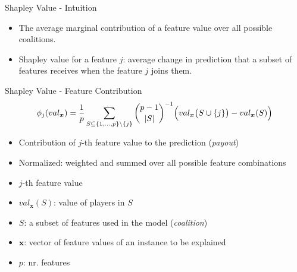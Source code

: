 \begin{frame}{Shapley Value - Intuition}
	\begin{itemize}
		\item The average marginal contribution of a feature value over all possible coalitions.
		\item Shapley value for a feature $j$: average change in prediction that a subset of features receives when the feature $j$ joins them.
	\end{itemize}
\end{frame}
\begin{frame}{Shapley Value - Feature Contribution}
\begin{equation}
	\phi_j(val_{\bm{x}})=\frac{1}{p}\sum_{S\subseteq\{1,\ldots,p\} \backslash \{j\}}\binom{p-1}{|S|}^{-1}\Bigl(val_{\bm{x}}\bigl(S\cup\{j\}\bigr)-val_{\bm{x}}(S)\Bigr)
\end{equation}
\begin{itemize}
	\item Contribution of $j$-th feature value to the prediction (\emph{payout})
	\item Normalized: weighted and summed over all possible feature combinations
	\item $j$-th feature value
	\item $val_{\bm{x}}(S)$: value of players in $S$ %
	\item $S$: a subset of features used in the model (\emph{coalition})
	\item $\bm{x}$: vector of feature values of an instance to be explained
	\item $p$: nr. features
\end{itemize}
\end{frame}



